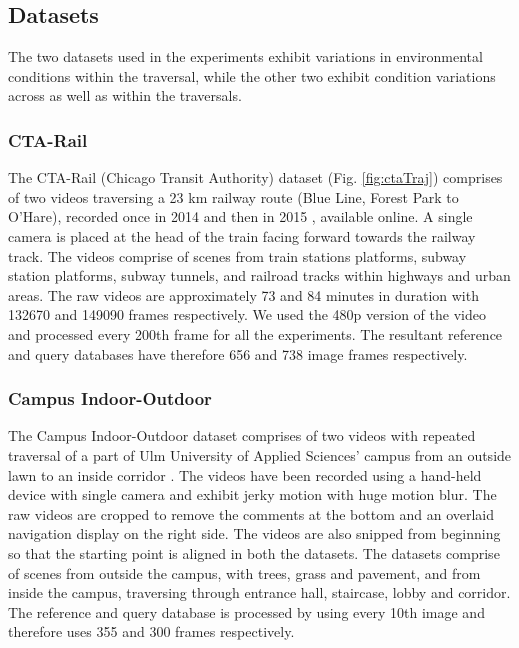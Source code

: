 \documentclass[letterpaper, 10 pt, conference]{ieeeconf}  %
\begin{document}
\subsection{Datasets}
The two datasets used in the experiments exhibit variations in environmental conditions within the traversal, while the other two exhibit condition variations across as well as within the traversals.

\subsubsection{CTA-Rail}
The CTA-Rail (Chicago Transit Authority) dataset (Fig. \ref{fig:ctaTraj}) comprises of two videos traversing a 23 km railway route (Blue Line, Forest Park to O'Hare), recorded once in 2014 \cite{ctaRail2014} and then in 2015 \cite{ctaRail2015}, available online. A single camera is placed at the head of the train facing forward towards the railway track. The videos comprise of scenes from train stations platforms, subway station platforms, subway tunnels, and railroad tracks within highways and urban areas. The raw videos are approximately 73 and 84 minutes in duration with 132670 and 149090 frames respectively. We used the 480p version of the video and processed every 200th frame for all the experiments. The resultant reference and query databases have therefore 656 and 738 image frames respectively.

\subsubsection{Campus Indoor-Outdoor}
The Campus Indoor-Outdoor dataset comprises of two videos with repeated traversal of a part of Ulm University of Applied Sciences' campus from an outside lawn to an inside corridor \cite{indoorOutdoor1,indoorOutdoor2}. The videos have been recorded using a hand-held device with single camera and exhibit jerky motion with huge motion blur. The raw videos are cropped to remove the comments at the bottom and an overlaid navigation display on the right side. The videos are also snipped from beginning so that the starting point is aligned in both the datasets. The datasets comprise of scenes from outside the campus, with trees, grass and pavement, and from inside the campus, traversing through entrance hall, staircase, lobby and corridor. The reference and query database is processed by using every 10th image and therefore uses 355 and 300 frames respectively.
\end{document}
